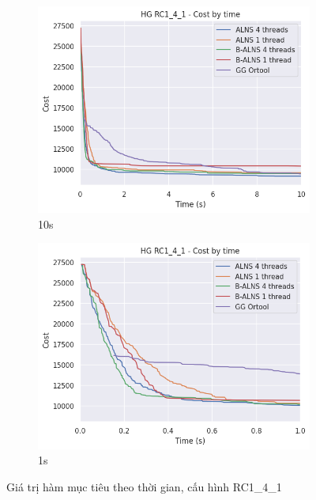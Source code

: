 \begin{figure}[H] %
  \label{fig:perf_ct_rc1_4}
  \begin{subfigure}{.5\textwidth}
    \centering
    \includegraphics[width=1\linewidth]{figures/cost_time_10s_RC1_4_1.png}
    \caption{10s}
    \label{fig:perf_ct_rc1_4_10s}
  \end{subfigure}%
  \begin{subfigure}{.5\textwidth}
    \centering
    \includegraphics[width=1\linewidth]{figures/cost_time_1s_RC1_4_1.png}
    \caption{1s}
    \label{fig:perf_ct_rc1_4_1s}
  \end{subfigure}
  \caption{Giá trị hàm mục tiêu theo thời gian, cấu hình RC1\_4\_1}
\end{figure}

